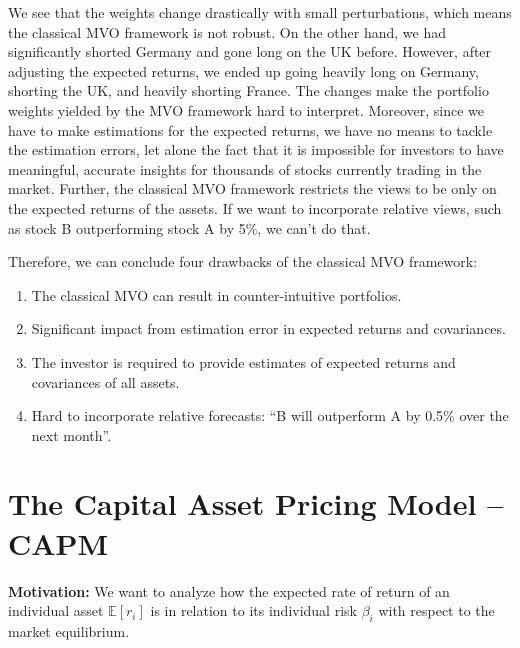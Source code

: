 \documentclass[13pt]{article}
\theoremstyle{definition}
\theoremstyle{remark}
\begin{document}
We see that the weights change drastically with small perturbations, which means the classical MVO framework is not robust. On the other hand, we had significantly shorted Germany and gone long on the UK before. However, after adjusting the expected returns, we ended up going heavily long on Germany, shorting the UK, and heavily shorting France. The changes make the portfolio weights yielded by the MVO framework hard to interpret. Moreover, since we have to make estimations for the expected returns, we have no means to tackle the estimation errors, let alone the fact that it is impossible for investors to have meaningful, accurate insights for thousands of stocks currently trading in the market. Further, the classical MVO framework restricts the views to be only on the expected returns of the assets. If we want to incorporate relative views, such as stock B outperforming stock A by 5\%, we can't do that. 

Therefore, we can conclude four drawbacks of the classical MVO framework:
\begin{enumerate}
    \item The classical MVO can result in counter-intuitive portfolios.
    \item Significant impact from estimation error in expected returns and covariances.
    \item The investor is required to provide estimates of expected
returns and covariances of all assets.
    \item Hard to incorporate relative forecasts: ``B will outperform A by
0.5\% over the next month''.
\end{enumerate}



\newpage
\section{The Capital Asset Pricing Model -- CAPM}\label{sec:capm}
{\color{C6}\textbf{Motivation:} We want to analyze how the expected rate of return of an individual asset $\mathbb{E}[r_i]$ is in relation to its individual risk $\beta_i$ with respect to the market equilibrium.}
\end{document}
